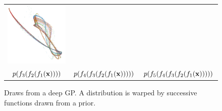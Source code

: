 \documentclass{article}
\begin{document}
\begin{figure}
\begin{tabular}{ccc}
\includegraphics[width=0.3\columnwidth]{figures/deep_draws/deep_gp_sample_layer_6} \\
$p(f_3(f_2(f_1({\bf{x}}))))$ & $p(f_4(f_3(f_2(f_1({\bf{x}})))))$ & $p(f_5(f_4(f_3(f_2(f_1({\bf{x}})))))$
\end{tabular}
\caption{Draws from a deep GP.  A distribution is warped by successive functions drawn from a \gp{} prior.}
\label{fig:filamentation}
\end{figure}
\end{document}

